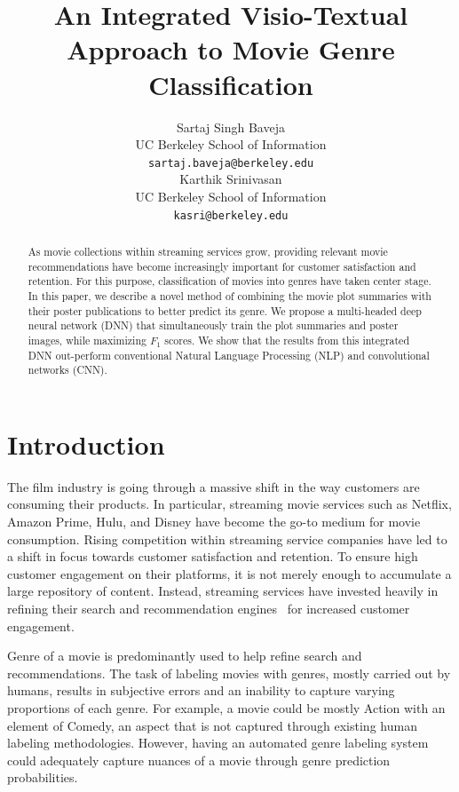 \documentclass[10pt]{article}
\title{An Integrated Visio-Textual Approach to Movie Genre Classification}
\author{
        Sartaj Singh Baveja \\
        UC Berkeley School of Information \\
        {\tt sartaj.baveja@berkeley.edu} \\\And
        Karthik Srinivasan \\
        UC Berkeley School of Information \\
        {\tt kasri@berkeley.edu} \\
}
\begin{document}
\maketitle


\begin{abstract}
As movie collections within streaming services grow, providing relevant movie recommendations have become increasingly important for customer satisfaction and retention. For this purpose, classification of movies into genres have taken center stage. In this paper, we describe a novel method of combining the movie plot summaries with their poster publications to better predict its genre. We propose a multi-headed deep neural network (DNN) that simultaneously train the plot summaries and poster images, while maximizing $F_1$ scores. We show that the results from this integrated DNN out-perform conventional Natural Language Processing (NLP) and convolutional networks (CNN).  
\end{abstract}

\section{Introduction}
\label{intro}
The film industry is going through a massive shift in the way customers are consuming their products. In particular, streaming movie services such as Netflix, Amazon Prime, Hulu, and Disney have become the go-to medium for movie consumption. Rising competition within streaming service companies have led to a shift in focus towards customer satisfaction and retention. To ensure high customer engagement on their platforms, it is not merely enough to accumulate a large repository of content. Instead, streaming services have invested heavily in refining their search and recommendation engines~\cite{NetflixChallenge} for increased customer engagement.

Genre of a movie is predominantly used to help refine search and recommendations. The task of labeling movies with genres, mostly carried out by humans, results in subjective errors and an inability to capture varying proportions of each genre. For example, a movie could be mostly Action with an element of Comedy, an aspect that is not captured through existing human labeling methodologies. However, having an automated genre labeling system could adequately capture nuances of a movie through genre prediction probabilities.
\end{document}

